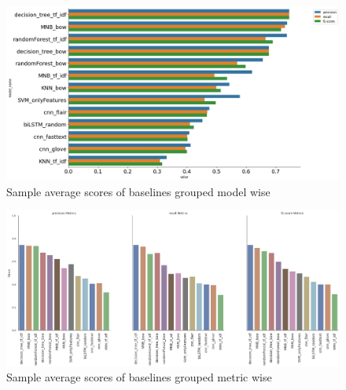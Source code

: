 \begin{figure}[h!]
    \centering
    \includegraphics[width=1\textwidth]{thesis/figures/Model_wise_prf.png}
    \caption{Sample average scores of baselines grouped model wise}
    \label{fig:label_wise_group_baselines}
\end{figure}
\pagebreak
\begin{figure}[]
    \centering
    \includegraphics[width=1\textwidth]{thesis/figures/labelwise_wise_prf _baselines.png}
    \caption{Sample average scores of baselines grouped metric wise}
    \label{fig:label_wise_group_baselines}
\end{figure}

